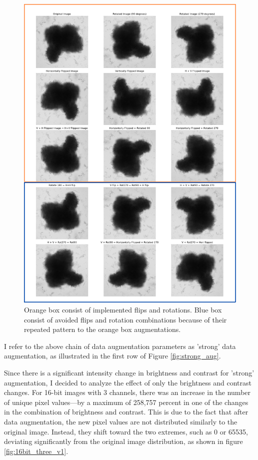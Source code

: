 \begin{figure}[H]
  \centering
  \includegraphics[scale=0.35]{figures/repeat.png} 
  \caption{Orange box consist of implemented flips and rotations. Blue box consist of avoided flips and rotation combinations because of their repeated pattern to
   the orange box augmentations.}
  \label{fig:repeat}
\end{figure}

I refer to the above chain of data augmentation parameters as 'strong' data augmentation, as illustrated in the first row of Figure \ref{fig:strong_aug}.

Since there is a significant intensity change in brightness and contrast for 'strong' augmentation, I decided to analyze the effect of only the brightness and contrast changes. For 16-bit images with 3 channels, there was an increase in the number of unique pixel values—by a maximum of 258,757 percent in one of the changes in the combination of brightness and contrast. This is due to the fact that after data augmentation, the new pixel values are not distributed similarly to the original image. Instead, they shift toward the two extremes, such as 0 or 65535, deviating significantly from the original image distribution, as shown in figure \ref{fig:16bit_three_v1}.

